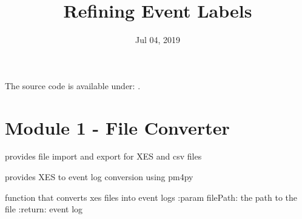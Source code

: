 \documentclass[letterpaper,10pt,english]{sphinxmanual}
\title{Refining Event Labels}
\date{Jul 04, 2019}
\author{}
\begin{document}
\pagestyle{empty}
\maketitle
\pagestyle{plain}
\sphinxtableofcontents
\pagestyle{normal}
\label{\detokenize{index::doc}}


The source code is available under: .


\chapter{Module 1 - File Converter}
\label{\detokenize{eventLogConverter:module-1-file-converter}}\label{\detokenize{eventLogConverter::doc}}
\begin{DUlineblock}{0em}
\item[] 
\end{DUlineblock}

\begin{fulllineitems}
\label{\detokenize{eventLogConverter:eventLogConverter.concreteImplementation.FileUtility}}
provides file import and export for XES and csv files

\end{fulllineitems}


\begin{fulllineitems}
\label{\detokenize{eventLogConverter:eventLogConverter.concreteImplementation.XESFileConverter}}
provides XES to event log conversion using pm4py

\begin{fulllineitems}
\label{\detokenize{eventLogConverter:eventLogConverter.concreteImplementation.XESFileConverter.convert}}
function that converts xes files into event logs
:param filePath: the path to the file
:return: event log

\end{fulllineitems}


\end{fulllineitems}
\end{document}
